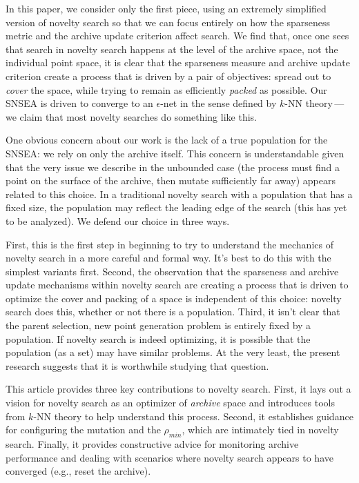 \documentclass[twoside]{article}
\begin{document}
In this paper, we consider only the first piece, using an extremely simplified version of novelty search so that we can focus entirely on how the sparseness metric and the archive update criterion affect search.  We find that, once one sees that search in novelty search happens at the level of the archive space, not the individual point space, it is clear that the sparseness measure and archive update criterion create a process that is driven by a pair of objectives:  spread out to \emph{cover} the space, while trying to remain as efficiently \emph{packed} as possible.  Our SNSEA is driven to converge to an $\epsilon$-net in the sense defined by $k$-NN theory\,---\,we claim that most novelty searches do something like this.

One obvious concern about our work is the lack of a true population for the SNSEA: we rely on only the archive itself.  This concern is understandable given that the very issue we describe in the unbounded case (the process must find a point on the surface of the archive, then mutate sufficiently far away) appears related to this choice.  In a traditional novelty search with a population that has a fixed size, the population may reflect the leading edge of the search (this has yet to be analyzed).  We defend our choice in three ways.

First, this is the first step in beginning to try to understand the mechanics of novelty search in a more careful and formal way.  It's best to do this with the simplest variants first.  Second, the observation that the sparseness and archive update mechanisms within novelty search are creating a process that is driven to optimize the cover and packing of a space is independent of this choice:  novelty search does this, whether or not there is a population.  Third, it isn't clear that the parent selection, new point generation problem is entirely fixed by a population.  If novelty search is indeed optimizing, it is possible that the population (as a set) may have similar problems.  At the very least, the present research suggests that it is worthwhile studying that question.

This article provides three key contributions to novelty search.  First, it lays out a  vision for novelty search as an optimizer of \emph{archive} space and introduces tools from $k$-NN theory to help understand this process.  Second, it establishes guidance for configuring the mutation and the $\rho_{min}$, which are intimately tied in novelty search.  Finally, it provides constructive advice for monitoring archive performance and dealing with scenarios where novelty search appears to have converged (e.g., reset the archive).  
\end{document}
